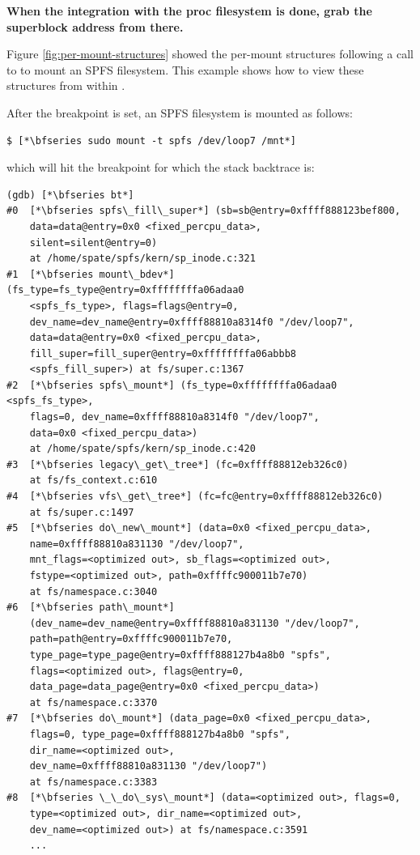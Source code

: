 \textbf{When the integration with the proc filesystem is done, grab the superblock address from there.}

Figure \ref{fig:per-mount-structures} showed the per-mount structures following a call to  to mount an SPFS filesystem. This example shows how to view these structures from within .

After the breakpoint is set, an SPFS filesystem is mounted as follows:

\begin{lstlisting}
$ [*\bfseries sudo mount -t spfs /dev/loop7 /mnt*]
\end{lstlisting}

\noindent
which will hit the breakpoint for which the stack backtrace is:

\begin{lstlisting}
(gdb) [*\bfseries bt*]
#0  [*\bfseries spfs\_fill\_super*] (sb=sb@entry=0xffff888123bef800, 
    data=data@entry=0x0 <fixed_percpu_data>, 
    silent=silent@entry=0) 
    at /home/spate/spfs/kern/sp_inode.c:321
#1  [*\bfseries mount\_bdev*] (fs_type=fs_type@entry=0xffffffffa06adaa0 
    <spfs_fs_type>, flags=flags@entry=0, 
    dev_name=dev_name@entry=0xffff88810a8314f0 "/dev/loop7", 
    data=data@entry=0x0 <fixed_percpu_data>, 
    fill_super=fill_super@entry=0xffffffffa06abbb8 
    <spfs_fill_super>) at fs/super.c:1367
#2  [*\bfseries spfs\_mount*] (fs_type=0xffffffffa06adaa0 <spfs_fs_type>, 
    flags=0, dev_name=0xffff88810a8314f0 "/dev/loop7", 
    data=0x0 <fixed_percpu_data>) 
    at /home/spate/spfs/kern/sp_inode.c:420
#3  [*\bfseries legacy\_get\_tree*] (fc=0xffff88812eb326c0) 
    at fs/fs_context.c:610
#4  [*\bfseries vfs\_get\_tree*] (fc=fc@entry=0xffff88812eb326c0) 
    at fs/super.c:1497
#5  [*\bfseries do\_new\_mount*] (data=0x0 <fixed_percpu_data>, 
    name=0xffff88810a831130 "/dev/loop7", 
    mnt_flags=<optimized out>, sb_flags=<optimized out>,  
    fstype=<optimized out>, path=0xffffc900011b7e70) 
    at fs/namespace.c:3040
#6  [*\bfseries path\_mount*] 
    (dev_name=dev_name@entry=0xffff88810a831130 "/dev/loop7", 
    path=path@entry=0xffffc900011b7e70, 
    type_page=type_page@entry=0xffff888127b4a8b0 "spfs", 
    flags=<optimized out>, flags@entry=0, 
    data_page=data_page@entry=0x0 <fixed_percpu_data>) 
    at fs/namespace.c:3370
#7  [*\bfseries do\_mount*] (data_page=0x0 <fixed_percpu_data>, 
    flags=0, type_page=0xffff888127b4a8b0 "spfs", 
    dir_name=<optimized out>, 
    dev_name=0xffff88810a831130 "/dev/loop7") 
    at fs/namespace.c:3383
#8  [*\bfseries \_\_do\_sys\_mount*] (data=<optimized out>, flags=0, 
    type=<optimized out>, dir_name=<optimized out>, 
    dev_name=<optimized out>) at fs/namespace.c:3591
    ...
\end{lstlisting}

